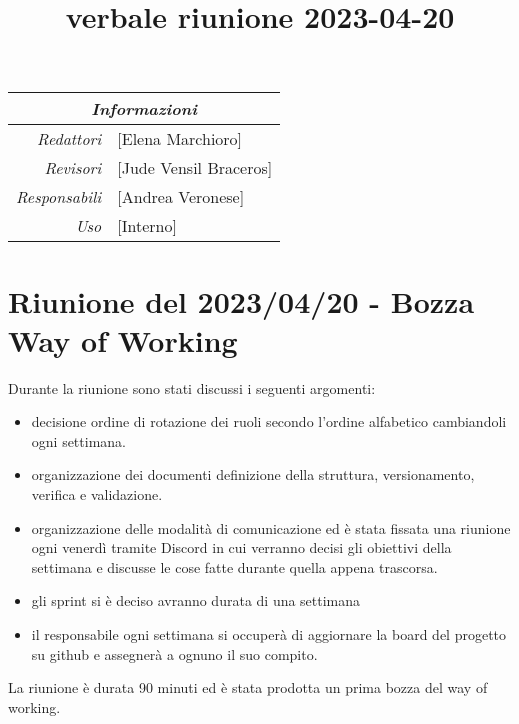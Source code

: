 \documentclass[12pt]{article}
\begin{document}
\graphicspath{ {../../templates/img} }

\title{verbale riunione 2023-04-20}

\firstPage

\maketitle
\begin{center}
    \begin{tabular}{r | l}
		\multicolumn{2}{c}{\textit{Informazioni}}\\
		\hline
		
			\textit{Redattori} &
			[Elena Marchioro]\makecell{}\\
		
			\textit{Revisori} &
			[Jude Vensil Braceros]\makecell{}\\
			\textit{Responsabili} &
			[Andrea Veronese]\makecell{}\\
		      \textit{Uso} & 
                [Interno]\makecell{}\\
\end{tabular}
\end{center}


\tableofcontents
\printindex 
\section{Riunione del 2023/04/20 - Bozza Way of Working}
Durante la riunione sono stati discussi i seguenti argomenti:
\begin{itemize}
    \item decisione ordine di rotazione dei ruoli secondo l'ordine alfabetico cambiandoli ogni settimana.
    \item organizzazione dei documenti definizione della struttura, versionamento, verifica e validazione.
    \item organizzazione delle modalità di comunicazione ed è stata fissata una riunione ogni venerdì tramite Discord in cui verranno decisi gli obiettivi della settimana e discusse le cose fatte durante quella appena trascorsa.
    \item gli sprint si è deciso avranno durata di una settimana
    \item il responsabile ogni settimana si occuperà di aggiornare la board del progetto su github e assegnerà a ognuno il suo compito.
\end{itemize}
La riunione è durata 90 minuti ed è stata prodotta un prima bozza del way of working.
\end{document}
